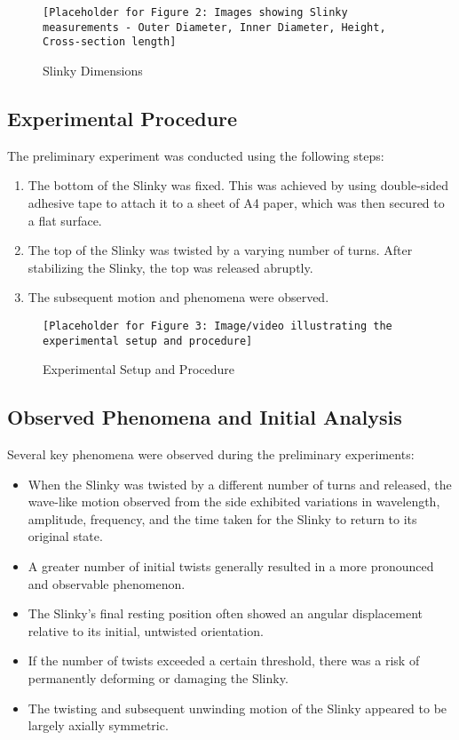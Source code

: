 \documentclass{mcmthesis}  %
\begin{document}
\begin{figure}[h!]
    \centering
    \texttt{[Placeholder for Figure 2: Images showing Slinky measurements - Outer Diameter, Inner Diameter, Height, Cross-section length]}
    \caption{Slinky Dimensions}
    \label{fig:slinky_dimensions}
\end{figure}

\subsection{Experimental Procedure} %
The preliminary experiment was conducted using the following steps:
\begin{enumerate}
    \item The bottom of the Slinky was fixed. This was achieved by using double-sided adhesive tape to attach it to a sheet of A4 paper, which was then secured to a flat surface.
    \item The top of the Slinky was twisted by a varying number of turns. After stabilizing the Slinky, the top was released abruptly.
    \item The subsequent motion and phenomena were observed.
\end{enumerate}

\begin{figure}[h!]
    \centering
    \texttt{[Placeholder for Figure 3: Image/video illustrating the experimental setup and procedure]}
    \caption{Experimental Setup and Procedure}
    \label{fig:exp_setup}
\end{figure}

\subsection{Observed Phenomena and Initial Analysis} %
Several key phenomena were observed during the preliminary experiments:
\begin{itemize}
    \item When the Slinky was twisted by a different number of turns and released, the wave-like motion observed from the side exhibited variations in wavelength, amplitude, frequency, and the time taken for the Slinky to return to its original state.
    \item A greater number of initial twists generally resulted in a more pronounced and observable phenomenon.
    \item The Slinky's final resting position often showed an angular displacement relative to its initial, untwisted orientation.
    \item If the number of twists exceeded a certain threshold, there was a risk of permanently deforming or damaging the Slinky.
    \item The twisting and subsequent unwinding motion of the Slinky appeared to be largely axially symmetric.
\end{itemize}
\end{document}
